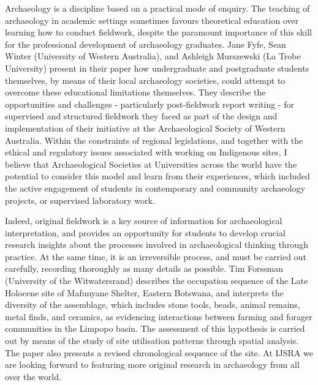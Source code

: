 Archaeology is a discipline based on a practical mode of enquiry. The teaching of archaeology in academic settings sometimes favours theoretical education over learning how to conduct fieldwork, despite the paramount importance of this skill for the professional development of archaeology graduates. Jane Fyfe, Sean Winter (University of Western Australia), and Ashleigh Murszewski (La Trobe University) present in their paper how undergraduate and postgraduate students themselves, by means of their local archaeology societies, could attempt to overcome these educational limitations themselves. They describe the opportunities and challenges - particularly post-fieldwork report writing - for supervised and structured fieldwork they faced as part of the design and implementation of their initiative at the Archaeological Society of Western Australia. Within the constraints of regional legislations, and together with the ethical and regulatory issues associated with working on Indigenous sites, I believe that Archaeological Societies at Universities across the world have the potential to consider this model and learn from their experiences, which included the active engagement of students in contemporary and community archaeology projects, or supervised laboratory work.

Indeed, original fieldwork is a key source of information for archaeological interpretation, and provides an opportunity for students to develop crucial research insights about the processes involved in archaeological thinking through practice. At the same time, it is an irreversible process, and must be carried out carefully, recording thoroughly as many details as possible. Tim Forssman (University of the Witwatersrand) describes the occupation sequence of the Late Holocene site of Mafunyane Shelter, Eastern Botswana, and interprets the diversity of the assemblage, which includes stone tools, beads, animal remains, metal finds, and ceramics, as evidencing interactions between farming and forager communities in the Limpopo basin. The assessment of this hypothesis is carried out by means of the study of site utilisation patterns through spatial analysis. The paper also presents a revised chronological sequence of the site. At IJSRA we are looking forward to featuring more original research in archaeology from all over the world. 

